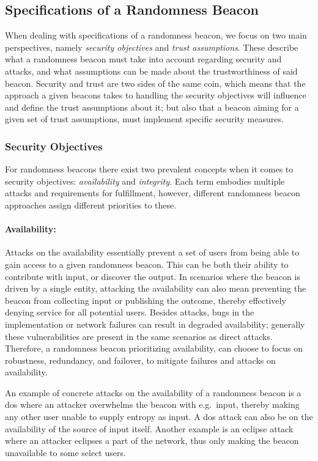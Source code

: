 \subsection{Specifications of a Randomness Beacon}
When dealing with specifications of a randomness beacon, we focus on two main perspectives, namely \emph{security objectives} and \emph{trust assumptions}.
These describe what a randomness beacon must take into account regarding security and attacks, and what assumptions can be made about the trustworthiness of said beacon.
Security and trust are two sides of the same coin, which means that the approach a given beacons takes to handling the security objectives will influence and define the trust assumptions about it;
but also that a beacon aiming for a given set of trust assumptions, must implement specific security measures.
\subsubsection{Security Objectives}\label{ssub:security_objectives}
For randomness beacons there exist two prevalent concepts when it comes to security objectives: \emph{availability} and \emph{integrity}.
Each term embodies multiple attacks and requirements for fulfillment, however, different randomness beacon approaches assign different priorities to these.

\paragraph{Availability:}
        Attacks on the availability essentially prevent a set of users from being able to gain access to a given randomness beacon.
        This can be both their ability to contribute with input, or discover the output.
        In scenarios where the beacon is driven by a single entity, attacking the availability can also mean preventing the beacon from collecting input or publishing the outcome, thereby effectively denying service for all potential users.
        Besides attacks, bugs in the implementation or network failures can result in degraded availability;
        generally these vulnerabilities are present in the same scenarios as direct attacks.
        Therefore, a randomness beacon prioritizing availability, can choose to focus on robustness, redundancy, and failover, to mitigate failures and attacks on availability.

        An example of concrete attacks on the availability of a randomness beacon is a
        \acrfull{dos} where an attacker overwhelms the beacon with e.g.\ input, thereby making any other user unable to supply entropy as input. A \gls{dos} attack can also be on the availability of the source of input itself. Another example is an eclipse attack where an attacker eclipses a part of the network, thus only making the beacon unavailable to some select users.

